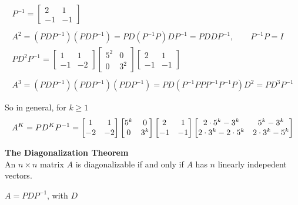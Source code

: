 \documentclass{article}
\begin{document}
    \[
        \begin{gathered}
        P^{-1}=\begin{bmatrix}
            2 &1\\
            -1 &-1
        \end{bmatrix}\\
        ~\\
        A^{2}=(PDP^{-1})(PDP^{-1})=PD(P^{-1}P)DP^{-1}=PDDP^{-1}, \qquad P^{-1}P=I\\
        PD^{2}P^{-1}=\begin{bmatrix}
            1 &1\\
            -1 &-2
        \end{bmatrix}
        \begin{bmatrix}
            5^{2} &0\\
            0 &3^{2}  
        \end{bmatrix}
        \begin{bmatrix}
            2 &1\\
            -1 &-1
        \end{bmatrix}\\
        ~\\
        A^{3}=(PDP^{-1})(PDP^{-1})(PDP^{-1})=PD(P^{-1}PPP^{-1}P^{-1}P)D^{2} =PD^{3}P^{-1}
        \end{gathered}
    \]

    So in general, for $ k \ge 1 $
    \[
        \begin{gathered}
        A^{K}=PD^{K}P^{-1}=
        \begin{bmatrix}
            1 &1\\
            -2 &-2
        \end{bmatrix}
        \begin{bmatrix}
            5^{k} &0\\
            0 &3^{k}  
        \end{bmatrix}
        \begin{bmatrix}
            2 &1\\
            -1 &-1
        \end{bmatrix}
        \end{gathered}\\
        \begin{bmatrix}
            2\cdot 5^{k}-3^{k} &5^{k}-3^{k}\\
            2 \cdot 3^{k}-2\cdot 5^{k} &2\cdot 3^{k}-5^{k}       
        \end{bmatrix}
    \]

    \textbf{The Diagonalization Theorem}\\
    An $ n \times n $ matrix $ A $ is diagonalizable if and only if $ A $ has $ n $ linearly indepedent vectors.

    $ A=PDP^{-1} $, with $ D $  
\end{document}
